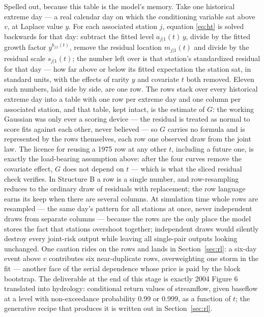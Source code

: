 \documentclass[11pt]{article}
\begin{document}
{\color{blue}Spelled out, because this table is the model's memory. Take one historical extreme day --- a real calendar day on which the conditioning variable sat above $v$, at {\color{green}Laplace} value $y$. For each associated station $j$, equation \eqref{eq:ht} is solved backwards for that day: subtract the fitted level $a_{j|1}(t)\, y$, divide by the fitted growth factor $y^{b_{j|1}(t)}$, remove the residual location $m_{j|1}(t)$ and divide by the residual scale $s_{j|1}(t)$; the number left over is that station's standardized residual for that day --- how far above or below its fitted expectation the station sat, in standard units, with the effects of rarity $y$ and covariate $t$ both removed. Eleven such numbers, laid side by side, are one row. The rows stack over every historical extreme day into a table with one row per extreme day and one column per associated station, and that table, kept intact, is the estimate of $G$: the working Gaussian was only ever a scoring device --- the residual is treated as normal to score fits against each other, never believed --- so $G$ carries no formula and is represented by the rows themselves, each row one observed draw from the joint law. The licence for reusing a 1975 row at any other $t$, including a future one, is exactly the load-bearing assumption above: after the four curves remove the covariate effect, $G$ does not depend on $t$ --- which is what the sliced residual check verifies. In Structure B a row is a single number, and row-resampling reduces to the ordinary draw of residuals with replacement; the row language earns its keep when there are several columns.} At simulation time whole rows are resampled --- the same day's pattern for all stations at once, never independent draws from separate columns --- because the rows are the only place the model stores the fact that stations overshoot together; independent draws would silently destroy every joint-risk output while leaving all single-pair outputs looking unchanged. {\color{blue}One caution rides on the rows and lands in Section~\ref{sec:rl}: a six-day event above $v$ contributes six near-duplicate rows, overweighting one storm in the fit --- another face of the serial dependence whose price is paid by the block bootstrap.} The deliverable at the end of this stage is exactly 2004 Figure 6 translated into hydrology: conditional return values of streamflow, given baseflow at a level with non-exceedance probability 0.99 or 0.999, as a function of $t$; the generative recipe that produces it is written out in Section~\ref{sec:rl}.
\end{document}
